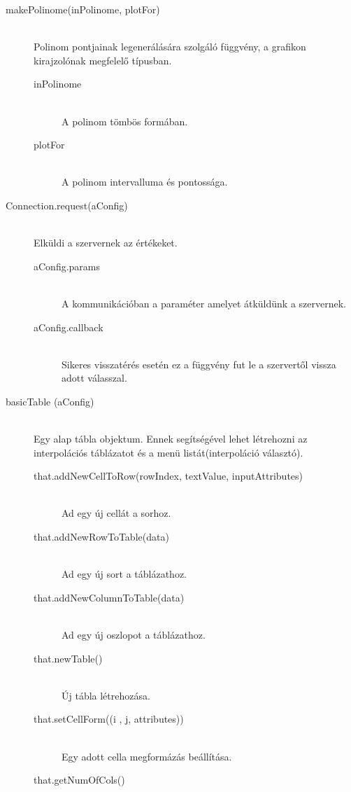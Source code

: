 	\begin{description}
		\item[makePolinome(inPolinome, plotFor)] \hfill \\ 
			Polinom pontjainak legenerálására szolgáló függvény, a grafikon kirajzolónak megfelelő típusban.
			\begin{description}
				\item[inPolinome] \hfill \\ 
					A polinom tömbös formában.
				\item[plotFor] \hfill \\ 
					A polinom intervalluma és pontossága.
			\end{description}
		\item[Connection.request(aConfig)] \hfill \\ 
			Elküldi a szervernek az értékeket.
			\begin{description}
				\item[aConfig.params] \hfill \\
				A kommunikációban a paraméter amelyet átküldünk a szervernek.
				\item[aConfig.callback] \hfill \\
				Sikeres visszatérés esetén ez a függvény fut le a szervertől vissza adott válasszal. 
			\end{description}
		\item[basicTable (aConfig)] \hfill \\ 
			Egy alap tábla objektum. Ennek segítségével lehet létrehozni az interpolációs táblázatot és a menü listát(interpoláció választó).
			\begin{description}
			\item[that.addNewCellToRow(rowIndex, textValue, inputAttributes)] 
				\hfill \\  Ad egy új cellát a sorhoz.
			\item[that.addNewRowToTable(data)]
				\hfill \\ Ad egy új sort a táblázathoz.
			\item[that.addNewColumnToTable(data)]
				\hfill \\ Ad egy új oszlopot a táblázathoz.
			\item[that.newTable()] 
				\hfill \\ Új tábla létrehozása.
			\item[that.setCellForm((i , j, attributes))] 
				\hfill \\ Egy adott cella megformázás beállítása.
			\item[that.getNumOfCols()] 

\end{description}
\end{description}

